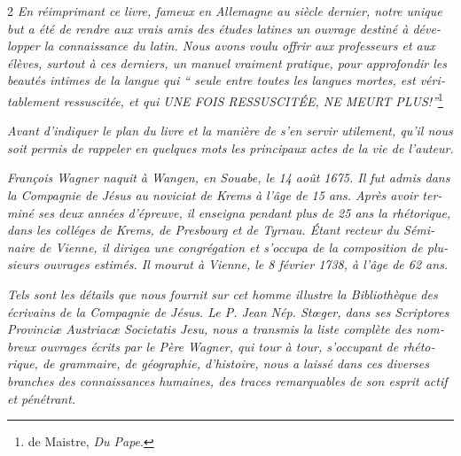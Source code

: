 \thispagestyle{plain}

\begin{otherlanguage}{french}
\begin{multicols}{2}
\textit{En réimprimant ce livre, fameux en Allemagne au siècle dernier, notre unique but a été de rendre aux vrais amis des études latines un ouvrage destiné à développer la connaissance du latin. Nous avons voulu offrir aux professeurs et aux élèves, surtout à ces derniers, un manuel vraiment pratique, pour approfondir les beautés intimes de la langue qui “ seule entre toutes les langues mortes, est véritablement ressuscitée, et qui UNE FOIS RESSUSCITÉE, NE MEURT PLUS!”}\footnote{de Maistre, \textit{Du Pape}.}

\textit{Avant d’indiquer le plan du livre et la manière de s’en servir utilement, qu’il nous soit permis de rappeler en quelques mots les principaux actes de la vie de l’auteur.}

\textit{ François Wagner naquit à Wangen, en Souabe, le 14 août 1675. Il fut admis dans la Compagnie de Jésus au noviciat de Krems à l’âge de 15 ans. Après avoir terminé ses deux années d’épreuve, il enseigna pendant plus de 25 ans la rhétorique, dans les colléges de Krems, de Presbourg et de Tyrnau. Étant recteur du Séminaire de Vienne, il dirigea une congrégation et s’occupa de la composition de plusieurs ouvrages estimés. Il mourut à Vienne, le 8 février 1738, à l’âge de 62 ans.}

\textit{Tels sont les détails que nous fournit sur cet homme illustre la Bibliothèque des écrivains de la Compagnie de Jésus. Le P. Jean Nép. Stœger, dans ses Scriptores Provinciæ Austriacæ Societatis Jesu, nous a transmis la liste complète des nombreux ouvrages écrits par le Père Wagner, qui tour à tour, s’occupant de rhétorique, de grammaire, de géographie, d’histoire, nous a laissé dans ces diverses branches des connaissances humaines, des traces remarquables de son esprit actif et pénétrant.}


\end{multicols}
\end{otherlanguage}
